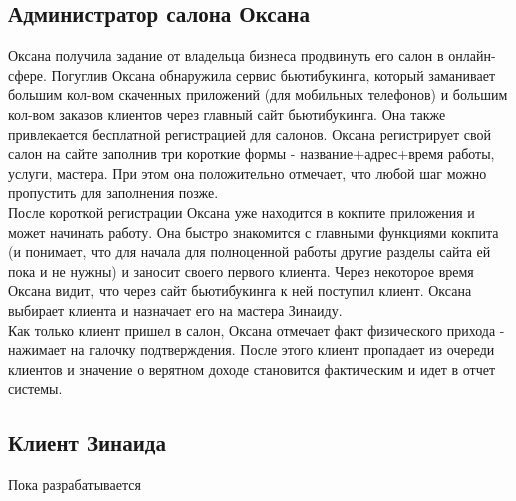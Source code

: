 \documentclass[DIV=calc, paper=a4, fontsize=11pt]{scrartcl} %
\begin{document}
\begin{framed}
    \subsection{Администратор салона Оксана}
    Оксана получила задание от владельца бизнеса продвинуть его салон в онлайн-сфере. Погуглив Оксана обнаружила сервис бьютибукинга, который заманивает большим кол-вом скаченных приложений (для мобильных телефонов) и большим кол-вом заказов клиентов через главный сайт бьютибукинга. Она также привлекается бесплатной регистрацией для салонов. Оксана регистрирует свой салон на сайте заполнив три короткие формы - название+адрес+время работы, услуги, мастера. При этом она положительно отмечает, что любой шаг можно пропустить для заполнения позже. 
    \\[0.5cm]
    После короткой регистрации Оксана уже находится в кокпите приложения и может начинать работу. Она быстро знакомится с главными функциями кокпита (и понимает, что для начала для полноценной работы другие разделы сайта ей пока и не нужны) и заносит своего первого клиента. Через некоторое время Оксана видит, что через сайт бьютибукинга к ней поступил клиент. Оксана выбирает клиента и назначает его на мастера Зинаиду. 
    \\[0.5cm]
    Как только клиент пришел в салон, Оксана отмечает факт физического прихода - нажимает на галочку подтверждения. После этого клиент пропадает из очереди клиентов и значение о верятном доходе становится фактическим и идет в отчет системы.
    
\end{framed}

\begin{framed}
    \subsection{Клиент Зинаида}
    Пока разрабатывается
\end{framed}
\end{document}
